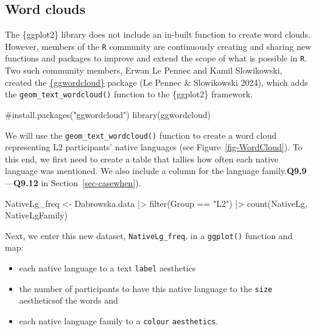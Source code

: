 \documentclass[
  letterpaper,
  DIV=11,
  numbers=noendperiod]{scrreprt}
\newenvironment{Shaded}{\begin{snugshade}}{\end{snugshade}}
\newcommand{\CommentTok}[1]{\textcolor[rgb]{0.37,0.37,0.37}{#1}}
\newcommand{\FunctionTok}[1]{\textcolor[rgb]{0.28,0.35,0.67}{#1}}
\newcommand{\NormalTok}[1]{\textcolor[rgb]{0.00,0.23,0.31}{#1}}
\newcommand{\OtherTok}[1]{\textcolor[rgb]{0.00,0.23,0.31}{#1}}
\newcommand{\SpecialCharTok}[1]{\textcolor[rgb]{0.37,0.37,0.37}{#1}}
\newcommand{\StringTok}[1]{\textcolor[rgb]{0.13,0.47,0.30}{#1}}
\providecommand{\tightlist}{%
  \setlength{\itemsep}{0pt}\setlength{\parskip}{0pt}}
\begin{document}
\subsection{Word clouds}\label{word-clouds}

The \{ggplot2\} library does not include an in-built function to create
word clouds. However, members of the \texttt{R} community are
continuously creating and sharing new functions and packages to improve
and extend the scope of what is possible in \texttt{R}. Two such
community members, Erwan Le Pennec and Kamil Slowikowski, created the
\href{https://lepennec.github.io/ggwordcloud/}{\{ggwordcloud\}} package
(Le Pennec \& Slowikowski 2024), which adds the
\texttt{geom\_text\_wordcloud()} function to the \{ggplot2\} framework.

\begin{Shaded}
\begin{Highlighting}[]
\CommentTok{\#install.packages("ggwordcloud")}
\FunctionTok{library}\NormalTok{(ggwordcloud)}
\end{Highlighting}
\end{Shaded}

We will use the \texttt{geom\_text\_wordcloud()} function to create a
word cloud representing L2 participants' native languages (see
Figure~\ref{fig-WordCloud}). To this end, we first need to create a
table that tallies how often each native language was mentioned. {We
also include a column for the language
family.}{\textbf{Q9.9}}---{\textbf{Q9.12}} in
Section~\ref{sec-casewhen}).

\begin{Shaded}
\begin{Highlighting}[]
\NormalTok{NativeLg\_freq }\OtherTok{\textless{}{-}}\NormalTok{ Dabrowska.data }\SpecialCharTok{|\textgreater{}} 
  \FunctionTok{filter}\NormalTok{(Group }\SpecialCharTok{==} \StringTok{"L2"}\NormalTok{) }\SpecialCharTok{|\textgreater{}} 
  \FunctionTok{count}\NormalTok{(NativeLg, NativeLgFamily)}
\end{Highlighting}
\end{Shaded}

Next, we enter this new dataset, \texttt{NativeLg\_freq}, in a
\texttt{ggplot()} function and map:

\begin{itemize}
\tightlist
\item
  each native language to a text \texttt{label} aesthetics
\item
  the number of participants to have this native language to the
  \texttt{size} aestheticsof the words and
\item
  each native language family to a \texttt{colour} \texttt{aesthetics}.
\end{itemize}
\end{document}
